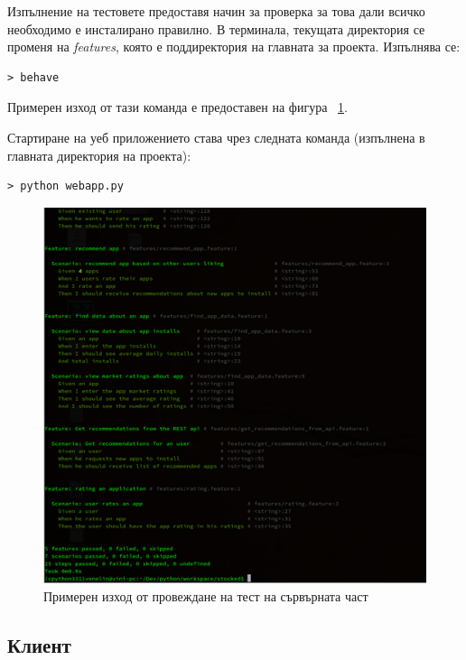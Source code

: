 	Изпълнение на тестовете предоставя начин за проверка за това дали всичко необходимо е инсталирано правилно. В терминала, текущата директория се променя на \emph{features}, която е поддиректория на главната за проекта. Изпълнява се:
	\begin{lstlisting}[style=BashStyle]
    > behave
	\end{lstlisting}		
	
	Примерен изход от тази команда е предоставен на фигура ~\ref{figure:server-test-output}.
	
	Стартиране на уеб приложението става чрез следната команда (изпълнена в главната директория на проекта):
	\begin{lstlisting}[style=BashStyle]
    > python webapp.py
	\end{lstlisting}		
	
	\begin{figure}[htbp]
		\centering
 		\includegraphics[scale=0.8]{assets/server-test-output.png}
		\caption{Примерен изход от провеждане на тест на сървърната част}
		\label{figure:server-test-output}
	\end{figure}
		
	\subsection{Клиент}
	
